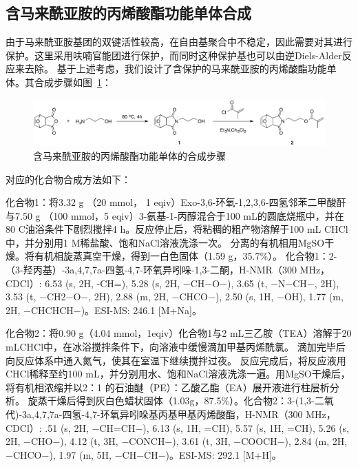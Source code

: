 \subsection{含马来酰亚胺的丙烯酸酯功能单体合成}

由于马来酰亚胺基团的双键活性较高，在自由基聚合中不稳定，因此需要对其进行保护。这里采用呋喃官能团进行保护，而同时这种保护基也可以由逆Diels-Alder反应来去除。
基于上述考虑，我们设计了含保护的马来酰亚胺的丙烯酸酯功能单体。其合成步骤如图~\ref{fig:maleimide-sync}：
\begin{figure}[htbp]
  \centering
  \includegraphics[width=\linewidth]{figures/ch3/ch3-maleimide-synth.png}
  \caption{含马来酰亚胺的丙烯酸酯功能单体的合成步骤}
  \label{fig:maleimide-sync}
\end{figure}

对应的化合物合成方法如下：

化合物1：将3.32 g （20 mmol， 1 eqiv）Exo-3,6-环氧-1,2,3,6-四氢邻苯二甲酸酐与7.50 g （100 mmol，5 eqiv）3-氨基-1-丙醇混合于100 mL的圆底烧瓶中，并在80 \text{$^\circ$}C油浴条件下剧烈搅拌4 h。反应停止后，将粘稠的粗产物溶解于100 mL CHCl中，并分别用1 M稀盐酸、饱和NaCl溶液洗涤一次。
分离的有机相用MgSO干燥。将有机相旋蒸真空干燥，得到一白色固体（1.59 g，35.7\%）。
化合物1：2-（3-羟丙基）-3a,4,7,7a-四氢-4,7-环氧异吲哚-1,3-二酮，H-NMR（300 MHz，CDCl）: \text{$\delta$} 6.53 (s, 2H, -CH=), 5.28 (s, 2H, −CH−O−), 3.65 (t, −N−CH−, 2H), 3.53 (t, −CH2−O−, 2H), 2.88 (m, 2H, −CHCO−), 2.50 (s, 1H, −OH), 1.77 (m, 2H, −CHCHCH−)。ESI-MS: 246.1 [M+Na]\text{$^+$}。

化合物2：将0.90 g（4.04 mmol，1eqiv）化合物1与2 mL三乙胺（TEA）溶解于20 mLCHCl中，在冰浴搅拌条件下，向溶液中缓慢滴加甲基丙烯酰氯。
滴加完毕后向反应体系中通入氮气，使其在室温下继续搅拌过夜。
反应完成后，将反应液用CHCl稀释至约100 mL，并分别用水、饱和NaCl溶液洗涤一遍。用MgSO干燥后，将有机相浓缩并以2：1 的石油醚（PE）：乙酸乙酯（EA）展开液进行柱层析分析。
旋蒸干燥后得到灰白色蜡状固体（1.03g，87.5\%）。化合物2：3-(1,3-二氧代)-3a,4,7,7a-四氢-4,7-环氧异吲哚基丙基甲基丙烯酸酯，H-NMR（300 MHz，CDCl）:\text{$\delta$} .51 (s, 2H, −CH=CH−), 6.13 (s, 1H, =CH), 5.57 (s, 1H, =CH), 5.26 (s, 2H, −CHO−), 4.12 (t, 3H, −CONCH−), 3.61 (t, 3H, −COOCH−), 2.84 (m, 2H, −CHCO−), 1.97 (m, 5H, −CH−CH−)。ESI-MS: 292.1 [M+H]\text{$^+$}。


